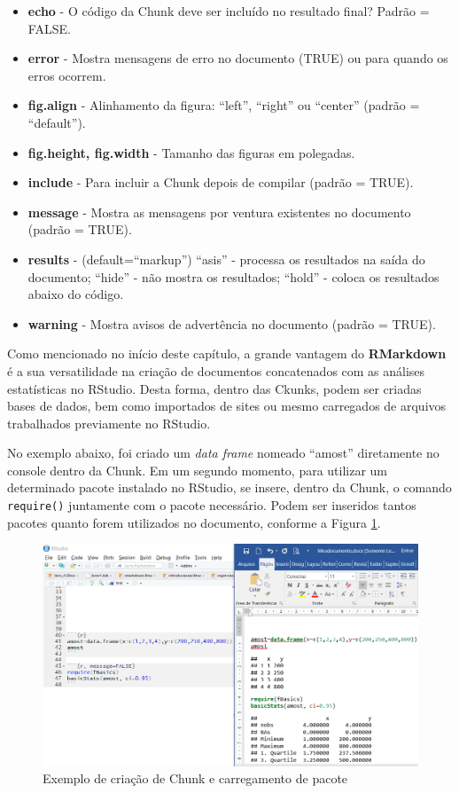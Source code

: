 \documentclass[12pt,brazil,oneside]{book}
\providecommand{\tightlist}{%
  \setlength{\itemsep}{0pt}\setlength{\parskip}{0pt}}
\begin{document}
\begin{itemize}
\tightlist
\item
  \textbf{echo} - O código da Chunk deve ser incluído no resultado final? Padrão = FALSE.
\item
  \textbf{error} - Mostra mensagens de erro no documento (TRUE) ou para quando os erros ocorrem.
\item
  \textbf{fig.align} - Alinhamento da figura: ``left'', ``right'' ou ``center'' (padrão = ``default'').
\item
  \textbf{fig.height, fig.width} - Tamanho das figuras em polegadas.
\item
  \textbf{include} - Para incluir a Chunk depois de compilar (padrão = TRUE).
\item
  \textbf{message} - Mostra as mensagens por ventura existentes no documento (padrão = TRUE).
\item
  \textbf{results} - (default=``markup'') ``asis'' - processa os resultados na saída do documento; ``hide'' - não mostra os resultados; ``hold'' - coloca os resultados abaixo do código.
\item
  \textbf{warning} - Mostra avisos de advertência no documento (padrão = TRUE).
\end{itemize}

Como mencionado no início deste capítulo, a grande vantagem do \textbf{RMarkdown} é a sua versatilidade na criação de documentos concatenados com as análises estatísticas no RStudio. Desta forma, dentro das Ckunks, podem ser criadas bases de dados, bem como importados de sites ou mesmo carregados de arquivos trabalhados previamente no RStudio.

No exemplo abaixo, foi criado um \emph{data frame} nomeado ``amost'' diretamente no console dentro da Chunk. Em um segundo momento, para utilizar um determinado pacote instalado no RStudio, se insere, dentro da Chunk, o comando \texttt{require()} juntamente com o pacote necessário. Podem ser inseridos tantos pacotes quanto forem utilizados no documento, conforme a Figura \ref{fig:rmarkchunk3}.

\begin{figure}[H]

{\centering \includegraphics[width=0.7\linewidth]{rmarkchunk3} 

}

\caption{Exemplo de criação de Chunk e carregamento de pacote}\label{fig:rmarkchunk3}
\end{figure}
\end{document}

